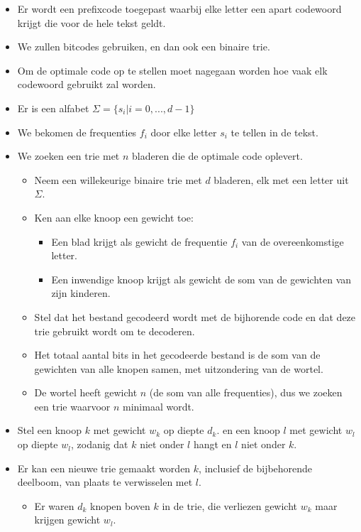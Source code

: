 \begin{itemize}
    \item Er wordt een prefixcode toegepast waarbij elke letter een apart codewoord krijgt die voor de hele tekst geldt.
    \item We zullen bitcodes gebruiken, en dan ook een binaire trie.
    \item Om de optimale code op te stellen moet nagegaan worden hoe vaak elk codewoord gebruikt zal worden.
    \item Er is een alfabet $\Sigma = \{s_i | i = 0, ..., d - 1\}$
    \item We bekomen de frequenties $f_i$ door elke letter $s_i$ te tellen in de tekst.
    \item We zoeken een trie met $n$ bladeren die de optimale code oplevert.
    \begin{itemize}
        \item Neem een willekeurige binaire trie met $d$ bladeren, elk met een letter uit $\Sigma$.
        \item Ken aan elke knoop een gewicht toe:
        \begin{itemize}
            \item Een blad krijgt als gewicht de frequentie $f_i$ van de overeenkomstige letter.
            \item Een inwendige knoop krijgt als gewicht de som van de gewichten van zijn kinderen.
        \end{itemize}
        \item Stel dat het bestand gecodeerd wordt met de bijhorende code en dat deze trie gebruikt wordt om te decoderen.
        \item Het totaal aantal bits in het gecodeerde bestand is de som van de gewichten van alle knopen samen, met uitzondering van de wortel.
        \item De wortel heeft gewicht $n$ (de som van alle frequenties), dus we zoeken een trie waarvoor $n$ minimaal wordt.
    \end{itemize}
    \item Stel een knoop $k$ met gewicht $w_k$ op diepte $d_k$. en een knoop $l$ met gewicht $w_l$ op diepte $w_l$, zodanig dat $k$ niet onder $l$ hangt en $l$ niet onder $k$.
    \item Er kan een nieuwe trie gemaakt worden $k$, inclusief de bijbehorende deelboom, van plaats te verwisselen met $l$.
    \begin{itemize}
        \item Er waren $d_k$ knopen boven $k$ in de trie, die verliezen gewicht $w_k$ maar krijgen gewicht $w_l$.

\end{itemize}
\end{itemize}
